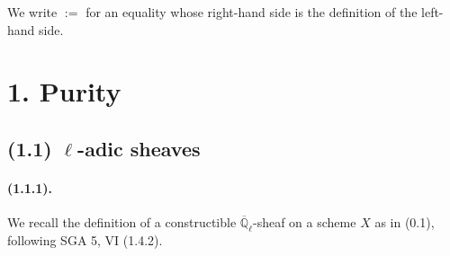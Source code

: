 \documentclass[11pt]{article}
\theoremstyle{remark}
\newcommand{\Qlb}{\overline{\mathbb{Q}}_\ell}
\begin{document}
We write $:=$ for an equality whose right-hand side is the definition of the left-hand side.

\section*{1. Purity}
\subsection*{(1.1) $\ell$-adic sheaves}

\paragraph{(1.1.1).} We recall the definition of a constructible $\Qlb$-sheaf on a scheme $X$ as in (0.1), following SGA 5, VI (1.4.2).
\end{document}
